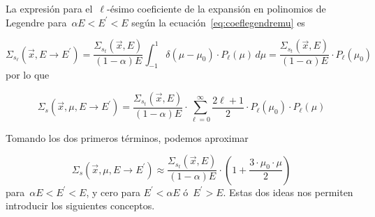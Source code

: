 La expresión para el~$\ell$-ésimo coeficiente de la expansión en polinomios de Legendre para~$\alpha E < E^\prime < E$ según la ecuación~\eqref{eq:coeflegendremu} es

\begin{equation*}
\Sigma_{s_\ell}(\vec{x}, E \rightarrow E^\prime) = \frac{\Sigma_{s_t}(\vec{x}, E)}{(1-\alpha) E} \int_{-1}^{1} \delta(\mu - \mu_0) \cdot P_\ell(\mu) \, d\mu = \frac{\Sigma_{s_t}(\vec{x}, E) }{(1-\alpha) E} \cdot P_\ell(\mu_0)
\end{equation*}
%
por lo que

\begin{equation*}
\Sigma_s(\vec{x}, \mu, E \rightarrow E^\prime) =
\frac{\Sigma_{s_t}(\vec{x},E)}{(1 - \alpha) E} \cdot \sum_{\ell=0}^{\infty} \frac{2\ell + 1}{2} \cdot P_\ell(\mu_0) \cdot P_\ell(\mu)
\end{equation*}

Tomando los dos primeros términos, podemos aproximar

\begin{equation*}
\Sigma_s(\vec{x}, \mu, E \rightarrow E^\prime) \approx
\frac{\Sigma_{s_t}(\vec{x},E)}{(1 - \alpha) E} \cdot \left(1 + \frac{3 \cdot \mu_0 \cdot \mu}{2}\right)
\end{equation*}
%
para~$\alpha E < E^\prime < E$, y cero para $E^{\prime} < \alpha E$ ó~$E^\prime > E$. Estas dos ideas nos permiten introducir los siguientes conceptos.

